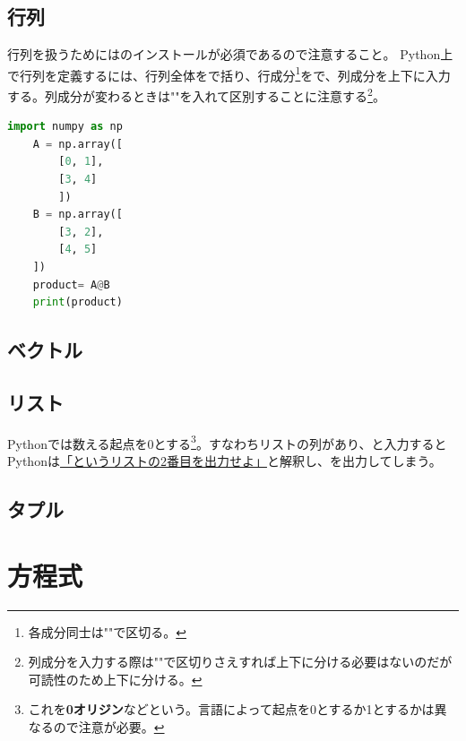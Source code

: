 \documentclass[dvipdfmx, leqno]{jsreport}
\begin{document}
\subsection{行列}%
    行列を扱うためにはのインストールが必須であるので注意すること。
    Python上で行列を定義するには、行列全体をで括り、行成分\footnote{各成分同士は"\type{,}"で区切る。}を\type{[]}で、列成分を上下に入力する。列成分が変わるときは"\type{,}"を入れて区別することに注意する\footnote{列成分を入力する際は"\type{,}"で区切りさえすれば上下に分ける必要はないのだが可読性のため上下に分ける。}。
\begin{lstlisting}[language=Python, caption={行列の定義},label={code:行列の定義}]
    import numpy as np
    A = np.array([
        [0, 1], 
        [3, 4]
        ])
    B = np.array([
        [3, 2],
        [4, 5]
    ])
    product= A@B
    print(product)
\end{lstlisting}

\subsection{ベクトル}%


\subsection{リスト}%
    Pythonでは数える起点を0とする\footnote{これを\textbf{0オリジン}などという。言語によって起点を0とするか1とするかは異なるので注意が必要。}。すなわちリストの列があり、と入力するとPythonは\underline{「というリストの2番目を出力せよ」}と解釈し、を出力してしまう。\\
    

\subsection{タプル}%


\section{方程式}%
\end{document}
